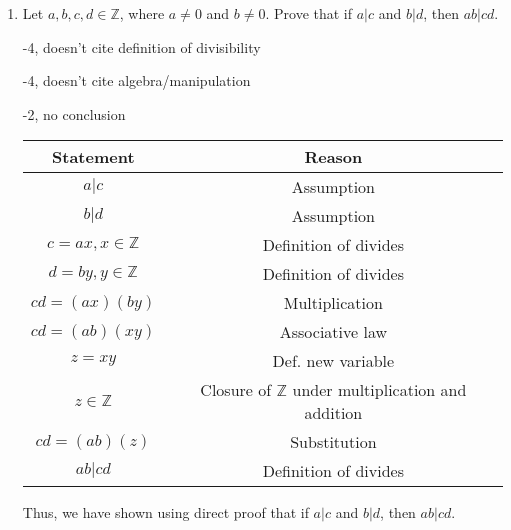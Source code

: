 \begin{enumerate}

















    



\item Let $a,b,c,d \in \mathbb{Z}$, where $a \neq 0$ and $b \neq 0$. Prove that if $a|c$ and $b|d$, then $ab|cd$. 

\begin{rubric}
-4, doesn't cite definition of divisibility

-4, doesn't cite algebra/manipulation

-2, no conclusion
\end{rubric}

\vspace{2mm}
\begin{solution}
\begin{tabular}{c|c}
    Statement & Reason \\
    \hline
    $a|c$ & Assumption \\
    $b|d$ & Assumption \\
    $c=ax, x \in \mathbb{Z}$ & Definition of divides \\
    $d=by, y \in \mathbb{Z}$ & Definition of divides \\
    $cd=(ax)(by)$ & Multiplication \\
    $cd=(ab)(xy)$ & Associative law \\
    $z = xy$ & Def. new variable \\
    $z \in \mathbb{Z}$ & Closure of $\mathbb{Z}$ under multiplication and addition \\
    $cd = (ab)(z)$ & Substitution \\
    $ab|cd$ & Definition of divides\\
\end{tabular}
Thus, we have shown using direct proof that if $a|c$ and $b|d$, then $ab|cd$. \square
\end{solution}


\end{enumerate}
